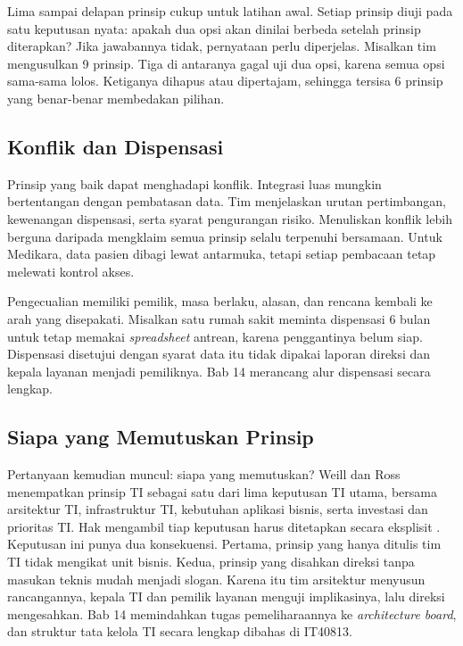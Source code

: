 Lima sampai delapan prinsip cukup untuk latihan awal. Setiap prinsip diuji pada
satu keputusan nyata: apakah dua opsi akan dinilai berbeda setelah prinsip
diterapkan? Jika jawabannya tidak, pernyataan perlu diperjelas. Misalkan tim
mengusulkan 9 prinsip. Tiga di antaranya gagal uji dua opsi, karena semua opsi
sama-sama lolos. Ketiganya dihapus atau dipertajam, sehingga tersisa 6 prinsip yang
benar-benar membedakan pilihan.

\subsection*{Konflik dan Dispensasi}

Prinsip yang baik dapat menghadapi konflik. Integrasi luas mungkin bertentangan
dengan pembatasan data. Tim menjelaskan urutan pertimbangan, kewenangan dispensasi,
serta syarat pengurangan risiko. Menuliskan konflik lebih berguna daripada
mengklaim semua prinsip selalu terpenuhi bersamaan. Untuk Medikara, data pasien
dibagi lewat antarmuka, tetapi setiap pembacaan tetap melewati kontrol akses.

Pengecualian memiliki pemilik, masa berlaku, alasan, dan rencana kembali ke arah
yang disepakati. Misalkan satu rumah sakit meminta dispensasi 6 bulan untuk tetap
memakai \textit{spreadsheet} antrean, karena penggantinya belum siap. Dispensasi
disetujui dengan syarat data itu tidak dipakai laporan direksi dan kepala layanan
menjadi pemiliknya. Bab 14 merancang alur dispensasi secara lengkap.

\subsection*{Siapa yang Memutuskan Prinsip}

Pertanyaan kemudian muncul: siapa yang memutuskan? Weill dan Ross menempatkan
prinsip TI sebagai satu dari lima keputusan TI utama, bersama arsitektur TI,
infrastruktur TI, kebutuhan aplikasi bisnis, serta investasi dan prioritas TI.
Hak mengambil tiap keputusan harus ditetapkan secara eksplisit \cite{c03-weill2004}.
Keputusan ini punya dua konsekuensi. Pertama, prinsip yang hanya ditulis tim TI
tidak mengikat unit bisnis. Kedua, prinsip yang disahkan direksi tanpa masukan
teknis mudah menjadi slogan. Karena itu tim arsitektur menyusun rancangannya, kepala
TI dan pemilik layanan menguji implikasinya, lalu direksi mengesahkan. Bab 14
memindahkan tugas pemeliharaannya ke \textit{architecture board}, dan struktur tata
kelola TI secara lengkap dibahas di IT40813.

